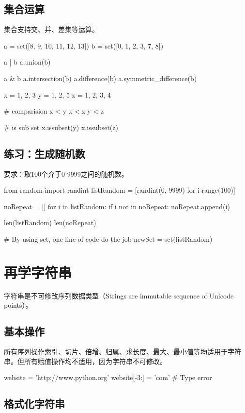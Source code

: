 \subsection{集合运算}
集合支持交、并、差集等运算。
\begin{python}
a = set([8, 9, 10, 11, 12, 13])
b = set([0, 1, 2, 3, 7, 8])

a | b   
a.union(b)

a & b    
a.intersection(b)  
a.difference(b) 
a.symmetric_difference(b) 

x = {1, 2, 3}
y = {1, 2, 5}
z = {1, 2, 3, 4}

#  comparision
x < y
x < z
y < z

#  is sub set
x.issubset(y)
x.issubset(z)
\end{python}
\subsection{练习：生成随机数}
要求：取100个介于0-9999之间的随机数。
\begin{python}
from random import randint
listRandom = [randint(0, 9999) for i range(100)]

noRepeat = []
for i in listRandom:
    if i not in noRepeat:
        noRepeat.append(i)

len(listRandom)
len(noRepeat)

# By using set, one line of code do the job
newSet = set(listRandom)
\end{python}

\section{再学字符串}
字符串是不可修改序列数据类型（Strings are immutable sequence of Unicode points）。
\subsection{基本操作}
所有序列操作索引、切片、倍增、归属、求长度、最大、最小值等均适用于字符串。但所有赋值操作均不适用，因为字符串不可修改。
\begin{python}
website = 'http://www.python.org'
website[-3:] = 'com'  # Type error
\end{python}
\subsection{格式化字符串}
